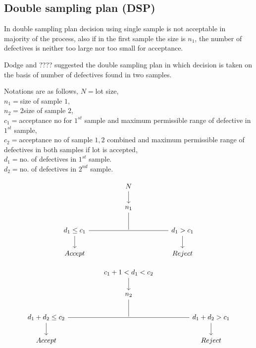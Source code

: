 \documentclass[oneside,11pt,pdftex]{book}%
\numberwithin{equation}{section}
\numberwithin{section}{chapter}
\numberwithin{equation}{chapter}
\begin{document}
\subsection{Double sampling plan (DSP)}
In double sampling plan decision using single sample is not acceptable in majority of the process, also if in the first sample the size is $ n_1 $, the number of defectives is neither too large nor too small for acceptance.

Dodge and ???? suggested the double sampling plan in which decision is taken on the basis of number of defectives found in two samples. 

Notations are as follows,
$ N= $lot size, \\
$ n_1= $size of sample $ 1 $,\\
$ n_2=2 $size of sample $ 2 $, \\
$ c_1= $acceptance no for $ 1^{st} $ sample and maximum permissible range of defective in $ 1^{st} $ sample, \\
$ c_2= $acceptance no of sample $ 1,2 $ combined and maximum permissible range of defectives in both samples if lot is accepted,\\
$ d_1= $no. of defectives in $ 1^{st} $ sample.\\
$ d_2= $no. of defectives in $ 2^{nd} $ sample.


\[\begin{tikzcd}
	&& N \\
	&& {n_1} \\
	{d_1\leq c_1} && {} && {d_1>c_1} \\
	Accept &&&& Reject
	\arrow[from=1-3, to=2-3]
	\arrow[no head, from=3-1, to=3-5]
	\arrow[from=3-1, to=4-1]
	\arrow[from=3-5, to=4-5]
	\arrow[no head, from=2-3, to=3-3]
\end{tikzcd}\]

\[\begin{tikzcd}
	&& c_1+1<d_1<c_2 \\
	&& {n_2} \\
	{d_1+d_2\leq c_2} && {} && {d_1+d_2>c_1} \\
	Accept &&&& Reject
	\arrow[from=1-3, to=2-3]
	\arrow[no head, from=3-1, to=3-5]
	\arrow[from=3-1, to=4-1]
	\arrow[from=3-5, to=4-5]
	\arrow[no head, from=2-3, to=3-3]
\end{tikzcd}\]
\end{document}
